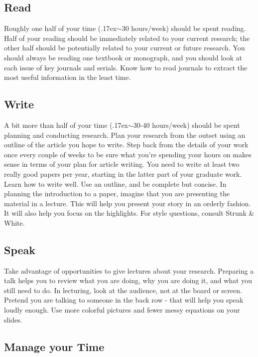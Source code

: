 \documentclass[12pt]{article}
\newcommand{\thinsim}{{\raise.17ex\hbox{\(\scriptstyle\mathtt{\sim}\)}}}
\begin{document}
\subsection*{Read}

Roughly one half of your time (\thinsim30 hours/week) should be spent reading.
Half of your reading should be immediately related to your current research; the other half should be potentially related to your current or future research.
You should always be reading one textbook or monograph, and you should look at each issue of key journals and serials.
Know how to read journals to extract the most useful information in the least time.

\subsection*{Write}

A bit more than half of your time (\thinsim30-40 hours/week) should be spent planning and conducting research.
Plan your research from the outset using an outline of the article you hope to write.
Step back from the details of your work once every couple of weeks to be sure what you're spending your hours on makes sense in terms of your plan for article writing.
You need to write at least two really good papers per year, starting in the latter part of your graduate work.
Learn how to write well.
Use an outline, and be complete but concise.
In planning the introduction to a paper, imagine that you are presenting the material in a lecture.
This will help you present your story in an orderly fashion.
It will also help you focus on the highlights.
For style questions, consult Strunk \& White.

\subsection*{Speak}

Take advantage of opportunities to give lectures about your research.
Preparing a talk helps you to review what you are doing, why you are doing it, and what you still need to do.
In lecturing, look at the audience, not at the board or screen.
Pretend you are talking to someone in the back row - that will help you speak loudly enough.
Use more colorful pictures and fewer messy equations on your slides.

\subsection*{Manage your Time}
\end{document}
